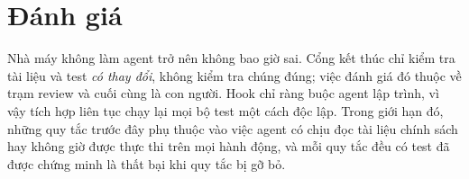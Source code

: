 \documentclass[../main.tex]{subfiles}
\begin{document}
\section{Đánh giá}
Nhà máy không làm agent trở nên không bao giờ sai. Cổng kết thúc chỉ kiểm tra tài liệu và test
\emph{có thay đổi}, không kiểm tra chúng đúng; việc đánh giá đó thuộc về trạm review và cuối cùng là
con người. Hook chỉ ràng buộc agent lập trình, vì vậy tích hợp liên tục chạy lại mọi bộ test một cách
độc lập. Trong giới hạn đó, những quy tắc trước đây phụ thuộc vào việc agent có chịu đọc tài liệu
chính sách hay không giờ được thực thi trên mọi hành động, và mỗi quy tắc đều có test đã được chứng
minh là thất bại khi quy tắc bị gỡ bỏ.
\end{document}
